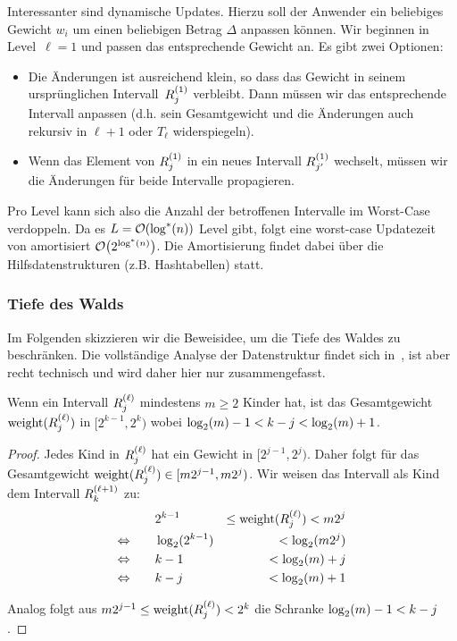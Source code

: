 Interessanter sind dynamische Updates.
Hierzu soll der Anwender ein beliebiges Gewicht $w_i$ um einen beliebigen Betrag $\Delta$ anpassen können.
Wir beginnen in Level~$\ell=1$ und passen das entsprechende Gewicht an.
Es gibt zwei Optionen:
\begin{itemize}
    \item Die Änderungen ist ausreichend klein, so dass das Gewicht in seinem ursprünglichen Intervall~$R^{(1)}_{j}$ verbleibt.
          Dann müssen wir das entsprechende Intervall anpassen (d.h. sein Gesamtgewicht und die Änderungen auch rekursiv in $\ell +1$ oder $T_\ell$ widerspiegeln).


    \item Wenn das Element von $R^{(1)}_{j}$ in ein neues Intervall $R^{(1)}_{j'}$ wechselt, müssen wir die Änderungen für beide Intervalle propagieren.
\end{itemize}

Pro Level kann sich also die Anzahl der betroffenen Intervalle im Worst-Case verdoppeln.
Da es $L = \mathcal{O}\!\left(\log^*(n)\right)$ Level gibt, folgt eine worst-case Updatezeit von amortisiert $\mathcal{O}\!\left(2^{\log^*(n)}\right)$.
Die Amortisierung findet dabei über die Hilfsdatenstrukturen (z.B. Hashtabellen) statt.

\subsubsection{Tiefe des Walds}
Im Folgenden skizzieren wir die Beweisidee, um die Tiefe des Waldes zu beschränken.
Die vollständige Analyse der Datenstruktur findet sich in~\cite{DBLP:journals/mst/MatiasVN03}, ist aber recht technisch und wird daher hier nur zusammengefasst.

\begin{lemma}\label{lem:nachfolger_intervall}
    Wenn ein Intervall $R^{(\ell)}_{j}$ mindestens $m \ge 2$ Kinder hat,
    ist das Gesamtgewicht $\mathrm{weight}(R^{(\ell)}_{j})$ in $[2^{k-1}, 2^k)$ wobei $\log_2(m) - 1 < k - j < \log_2(m) + 1$.
\end{lemma}
\begin{proof}
    Jedes Kind in $R^{(\ell)}_{j}$ hat ein Gewicht in $[2^{j-1}, 2^j)$.
    Daher folgt für das Gesamtgewicht $\mathrm{weight}(R^{(\ell)}_{j}) \in [m2^{j-1}, m2^j)$.
    Wir weisen das Intervall als Kind dem Intervall $R^{(\ell+1)}_{k}$ zu:
    \begin{align}
                               & 2^{k-1}      & \le \mathrm{weight}(R^{(\ell)}_{j}) < m2^j \\
        \Leftrightarrow \qquad & \log_2(2^{k-1}) & < \log_2(m2^{j})             \\
        \Leftrightarrow \qquad & k - 1        & < \log_2(m) + j              \\
        \Leftrightarrow \qquad & k - j        & < \log_2(m) + 1
    \end{align}

    \noindent
    Analog folgt aus $m2^{j-1} \le \mathrm{weight}(R^{(\ell)}_{j}) < 2^k$ die Schranke $\log_2(m) - 1 < k - j$.
\end{proof}

